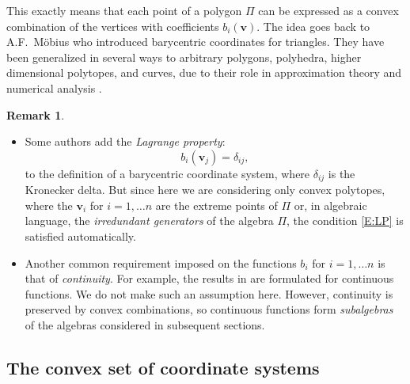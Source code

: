 \documentclass[12pt]{amsart}
\theoremstyle{plain}
\theoremstyle{definition}
\newtheorem{remark}[theorem]{Remark}
\numberwithin{equation}{section}
\begin{document}
This exactly means that each point of a polygon $\Pi$ can be expressed as a convex combination of the vertices with coefficients $b_i(\mathbf v)$. The idea goes back to A.F.~M\"{o}bius \cite{Moebius} who introduced barycentric coordinates for triangles. They have been generalized in several ways to arbitrary polygons, polyhedra, higher dimensional polytopes, and curves, due to their role in approximation theory and numerical analysis \cite{HS17}.

\begin{remark}
\begin{itemize}
\item[$(\mathrm i)$] Some authors add the \emph{Lagrange property}:
\begin{equation}\label{E:LP}
b_i(\mathbf v_j)=\delta_{ij},
\end{equation}
to the definition of a barycentric coordinate system, where $\delta_{ij}$ is the Kronecker delta. But since here we are considering only convex polytopes, where the $\mathbf v_i$ for $i=1,\ldots n$ are the extreme points of $\Pi$ or, in algebraic language, the \emph{irredundant generators} of the algebra $\Pi$, the condition \eqref{E:LP} is satisfied automatically.
\item[$(\mathrm{ii})$] Another common requirement imposed on the functions $b_i$ for $i=1,\ldots n$ is that of \emph{continuity}. For example, the results in \cite{G} are formulated for continuous functions. We do not make such an assumption here. However, continuity is preserved by convex combinations, so continuous functions form \emph{subalgebras} of the algebras considered in subsequent sections.
\end{itemize}
\end{remark}


\subsection{The convex set of coordinate systems}
\end{document}
